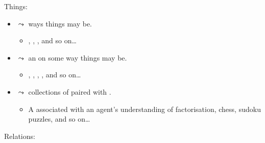 \documentclass[10pt]{article}
\begin{document}
\begin{note}
  Things:

  \begin{itemize}
  \item
     \(\leadsto\) ways things may be.
    \begin{itemize}
    \item
      , , , and so on\dots
    \end{itemize}
  \item
     \(\leadsto\) an \agpe{} on some way things may be.
    \begin{itemize}
    \item
      , , , , and so on\dots
    \end{itemize}
  \item
     \(\leadsto\) collections of  paired with .
    \begin{itemize}
    \item
      A \pool{} associated with an agent's understanding of factorisation, chess, sudoku puzzles, and so on\dots
    \end{itemize}
  \end{itemize}


  \noindent
  Relations:


\end{note}
\end{document}
